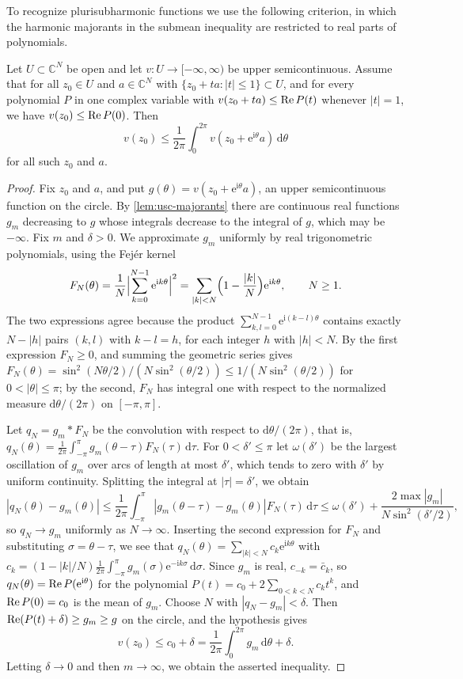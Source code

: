 To recognize plurisubharmonic functions we use the following criterion, in which the harmonic majorants in the submean inequality are restricted to real parts of polynomials.

\begin{lemma}\label{lem:polynomial-disc-comparison}
Let $U\subset\mathbb C^N$ be open and let $v\colon U\to[-\infty,\infty)$ be upper semicontinuous. Assume that for all $z_0\in U$ and $a\in\mathbb C^N$ with $\{z_0+ta:|t|\le1\}\subset U$, and for every polynomial $P$ in one complex variable with $v(z_0+ta)\le\operatorname{Re} P(t)$ whenever $|t|=1$, we have $v(z_0)\le\operatorname{Re} P(0)$. Then
\[
 v(z_0)\le\frac1{2\pi}\int_0^{2\pi}v(z_0+\mathrm e^{\mathrm i\theta}a)\,\mathrm d\theta
\]
for all such $z_0$ and $a$.
\end{lemma}
\begin{proof}
Fix $z_0$ and $a$, and put $g(\theta)=v(z_0+\mathrm e^{\mathrm i\theta}a)$, an upper semicontinuous function on the circle. By \cref{lem:usc-majorants} there are continuous real functions $g_m$ decreasing to $g$ whose integrals decrease to the integral of $g$, which may be $-\infty$. Fix $m$ and $\delta>0$. We approximate $g_m$ uniformly by real trigonometric polynomials, using the Fej\'er kernel
\[
 F_N(\theta)=\frac1N\Bigl|\sum_{k=0}^{N-1}\mathrm e^{\mathrm ik\theta}\Bigr|^2=\sum_{|k|<N}\Bigl(1-\frac{|k|}N\Bigr)\mathrm e^{\mathrm ik\theta},\qquad N\ge1.
\]
The two expressions agree because the product $\sum_{k,l=0}^{N-1}\mathrm e^{\mathrm i(k-l)\theta}$ contains exactly $N-|h|$ pairs $(k,l)$ with $k-l=h$, for each integer $h$ with $|h|<N$. By the first expression $F_N\ge0$, and summing the geometric series gives $F_N(\theta)=\sin^2(N\theta/2)/(N\sin^2(\theta/2))\le1/(N\sin^2(\theta/2))$ for $0<|\theta|\le\pi$; by the second, $F_N$ has integral one with respect to the normalized measure $\mathrm d\theta/(2\pi)$ on $[-\pi,\pi]$.

Let $q_N=g_m*F_N$ be the convolution with respect to $\mathrm d\theta/(2\pi)$, that is, $q_N(\theta)=\frac1{2\pi}\int_{-\pi}^{\pi}g_m(\theta-\tau)F_N(\tau)\,\mathrm d\tau$. For $0<\delta'\le\pi$ let $\omega(\delta')$ be the largest oscillation of $g_m$ over arcs of length at most $\delta'$, which tends to zero with $\delta'$ by uniform continuity. Splitting the integral at $|\tau|=\delta'$, we obtain
\[
 |q_N(\theta)-g_m(\theta)|\le\frac1{2\pi}\int_{-\pi}^{\pi}|g_m(\theta-\tau)-g_m(\theta)|F_N(\tau)\,\mathrm d\tau\le\omega(\delta')+\frac{2\max|g_m|}{N\sin^2(\delta'/2)},
\]
so $q_N\to g_m$ uniformly as $N\to\infty$. Inserting the second expression for $F_N$ and substituting $\sigma=\theta-\tau$, we see that $q_N(\theta)=\sum_{|k|<N}c_k\mathrm e^{\mathrm ik\theta}$ with $c_k=(1-|k|/N)\frac1{2\pi}\int_{-\pi}^{\pi}g_m(\sigma)\mathrm e^{-\mathrm ik\sigma}\,\mathrm d\sigma$. Since $g_m$ is real, $c_{-k}=\bar c_k$, so $q_N(\theta)=\operatorname{Re} P(\mathrm e^{\mathrm i\theta})$ for the polynomial $P(t)=c_0+2\sum_{0<k<N}c_kt^k$, and $\operatorname{Re} P(0)=c_0$ is the mean of $g_m$. Choose $N$ with $|q_N-g_m|<\delta$. Then $\operatorname{Re}(P(t)+\delta)\ge g_m\ge g$ on the circle, and the hypothesis gives
\[
 v(z_0)\le c_0+\delta=\frac1{2\pi}\int_0^{2\pi}g_m\,\mathrm d\theta+\delta.
\]
Letting $\delta\to0$ and then $m\to\infty$, we obtain the asserted inequality.
\end{proof}
